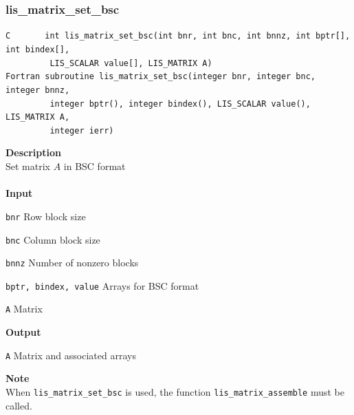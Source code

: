 \documentclass[a4paper]{article}
\newcommand{\namelistlabel}[1]{\mbox{#1}\hfill}
\newenvironment{namelist}[1]{%
 \begin{list}{}
  {\let\makelabel\namelistlabel
  \settowidth{\labelwidth}{#1}
  \setlength{\leftmargin}{1.1\labelwidth}}
}{%
\end{list}}
\begin{document}
  \subsubsection{lis\_matrix\_set\_bsc}
\begin{screen}
\verb|C       int lis_matrix_set_bsc(int bnr, int bnc, int bnnz, int bptr[], int bindex[],|\\
\verb|         LIS_SCALAR value[], LIS_MATRIX A)|\\
\verb|Fortran subroutine lis_matrix_set_bsc(integer bnr, integer bnc, integer bnnz,|\\
\verb|         integer bptr(), integer bindex(), LIS_SCALAR value(), LIS_MATRIX A,|\\
\verb|         integer ierr)|
\end{screen}
{\bf Description}\\
\indent
Set matrix $A$ in BSC format
\\ \\
\noindent
{\bf Input}
\begin{namelist}{XXXXXXXXXXXXXXXXXXXX}
\item[\tt bnr] Row block size
\item[\tt bnc] Column block size
\item[\tt bnnz] Number of nonzero blocks
\item[\tt bptr, bindex, value] Arrays for BSC format
\item[\tt A] Matrix
\end{namelist}
{\bf Output}
\begin{namelist}{XXXXXXXXXXXXXXXXXXXX}
\item[\tt A] Matrix and associated arrays
\end{namelist}
\noindent
{\bf Note}\\
\indent
When \verb|lis_matrix_set_bsc| is used, 
the function \verb|lis_matrix_assemble| must be called. 

\newpage
\end{document}
